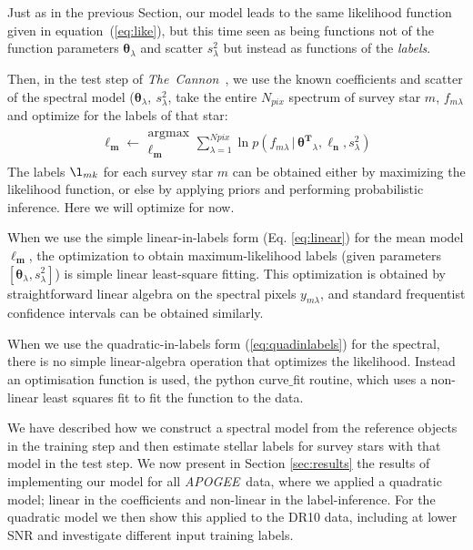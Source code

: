 \documentclass[12pt, preprint]{aastex}
\newcommand{\sectionname}{Section}
\newcommand{\set}[1]{\bm{#1}}
\newcommand{\given}{\,|\,}
\newcommand{\tc}{\textsl{The~Cannon}}
\newcommand{\apogee}{\textsl{APOGEE}}
\begin{document}
Just as in the previous \sectionname, our model leads to the same likelihood function given in
equation~(\ref{eq:like}), but this time seen as
being functions not of the function parameters $\set{\theta}_\lambda$ and
scatter $s_\lambda^2$ but instead as functions of the \emph{labels}.

Then, in the test step of \tc\ , we use the known coefficients and scatter of the spectral model
($\set{\theta}_\lambda,\ s_\lambda^2$,
take the entire $N_{pix}$ spectrum of survey star $m$, $f_{m\lambda}$ and optimize for the labels of that star:
\begin{eqnarray}
\boldsymbol{\ell_m} \leftarrow \substack{\mbox{argmax}\\
{\boldsymbol{\ell_m}  }}
\sum_{\lambda=1}^{Npix}
\ln p(f_{m\lambda}\given\set{\theta^T}_\lambda, \boldsymbol{\ell_n}, s_\lambda^2)
\label{eq:teststep}
\end{eqnarray} 
The labels $\l_{mk}$ for each survey star $m$ can be obtained either by maximizing
the likelihood function, or else by applying priors
and performing probabilistic inference.
Here we will optimize for now.

When we use the simple linear-in-labels form (Eq. \ref{eq:linear}) for the
mean model $\set{\ell_m}$, the optimization to obtain maximum-likelihood labels
(given parameters $[\set{\theta}_\lambda, s_\lambda^2]$) is simple linear
least-square fitting.
This optimization is obtained by straightforward linear algebra on the
spectral pixels $y_{m\lambda}$, and standard frequentist confidence
intervals can be obtained similarly.

When we use the quadratic-in-labels form (\ref{eq:quadinlabels}) for the
spectral, there is no simple linear-algebra operation that
optimizes the likelihood. 
Instead an optimisation function is used, the python curve$\_$fit routine, which uses a non-linear least squares fit to fit the function to the data. 

We have described how we construct a spectral model from the reference objects in the training step and then 
estimate stellar labels for survey stars with that model in the test step. 
We now present in Section \ref{sec:results} the results of implementing our model for all \apogee\ data, where we applied a quadratic model; linear in the coefficients and non-linear in the label-inference.  
For the quadratic model we then show this applied to the DR10 data, including at lower SNR and investigate different input training labels. 
\end{document}
